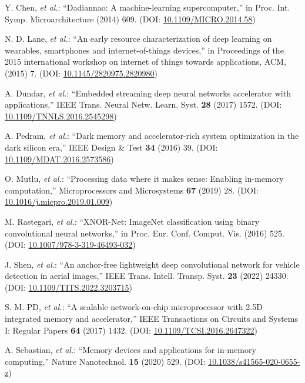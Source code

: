 \documentclass[submit]{elex2024}%
\begin{document}
\begin{thebibliography}{99}%

Y. Chen, {\it et al.}: ``Dadiannao: A machine-learning supercomputer,'' in Proc. Int. Symp. Microarchitecture (2014) 609. (DOI: \href{https://doi.org/10.1109/MICRO.2014.58}{10.1109/MICRO.2014.58})

N. D. Lane, {\it et al.}: ``An early resource characterization of deep learning on wearables, smartphones and internet-of-things devices,'' in Proceedings of the 2015 international workshop on internet of things towards applications, ACM, (2015) 7. (DOI: \href{http://dx.doi.org/10.1145/2820975.2820980}{10.1145/2820975.2820980})

A. Dundar, {\it et al.}: ``Embedded streaming deep neural networks accelerator with applications,'' IEEE Trans. Neural Netw. Learn. Syst. {\bf 28} (2017) 1572. (DOI: \href{https://doi.org/10.1109/TNNLS.2016.2545298}{10.1109/TNNLS.2016.2545298})

A. Pedram, {\it et al.}: ``Dark memory and accelerator-rich system optimization in the dark silicon era,'' IEEE Design \& Test {\bf 34} (2016) 39. (DOI: \href{https://doi.org/10.1109/MDAT.2016.2573586}{10.1109/MDAT.2016.2573586})

O. Mutlu, {\it et al.}: ``Processing data where it makes sense: Enabling in-memory computation,'' Microprocessors and Microsystems {\bf 67} (2019) 28. (DOI: \href{https://doi.org/10.1016/j.micpro.2019.01.009}{10.1016/j.micpro.2019.01.009})

M. Rastegari, {\it et al.}: ``XNOR-Net: ImageNet classification using binary convolutional neural networks,'' in Proc. Eur. Conf. Comput. Vis. (2016) 525. (DOI: \href{https://doi.org/10.1007/978-3-319-46493-032}{10.1007/978-3-319-46493-032})

J. Shen, {\it et al.}: ``An anchor-free lightweight deep convolutional network for vehicle detection in aerial images,'' IEEE Trans. Intell. Transp. Syst. {\bf 23} (2022) 24330. (DOI: \href{https://doi.org/10.1109/TITS.2022.3203715}{10.1109/TITS.2022.3203715})

S. M. PD, {\it et al.}: ``A scalable network-on-chip microprocessor with 2.5D integrated memory and accelerator,'' IEEE Transactions on Circuits and Systems I: Regular Papers {\bf 64} (2017) 1432. (DOI: \href{https://doi.org/10.1109/TCSI.2016.2647322}{10.1109/TCSI.2016.2647322})

A. Sebastian, {\it et al.}: ``Memory devices and applications for in-memory computing,'' Nature Nanotechnol. {\bf 15} (2020) 529. (DOI: \href{https://doi.org/10.1038/s41565-020-0655-z}{10.1038/s41565-020-0655-z})


\end{thebibliography}
\end{document}
